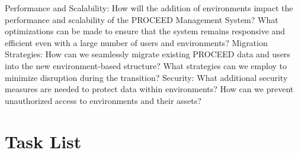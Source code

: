 \begin{enumerate}
Performance and Scalability: How will the addition of environments impact the performance and scalability of the PROCEED Management System? What optimizations can be made to ensure that the system remains responsive and efficient even with a large number of users and environments?
Migration Strategies: How can we seamlessly migrate existing PROCEED data and users into the new environment-based structure? What strategies can we employ to minimize disruption during the transition?
Security: What additional security measures are needed to protect data within environments? How can we prevent unauthorized access to environments and their assets?
\end{enumerate}


\chapter{Task List}
\label{cha:tasklist}



